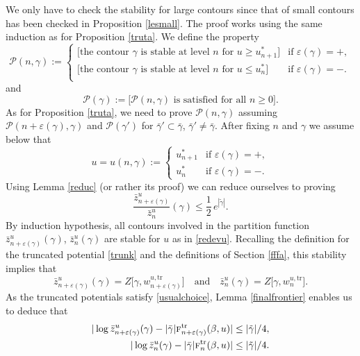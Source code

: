 \documentclass[10pt]{amsart}
\let\mathcal\mathscr
\numberwithin{equation}{section}
\theoremstyle{plain}
\theoremstyle{definition}
\newcommand{\cP}{{\ensuremath{\mathcal P}} }
\newcommand{\gb}{\beta}
\newcommand{\gep}{\varepsilon}
\newcommand{\tr}{\mathrm{tr}}
\newcommand{\tf}{\textsc{f}}
\begin{document}
We only have to check the stability for large contours since that of small contours has been checked in Proposition \ref{lesmall}.
The proof works using the same induction as for Proposition \ref{truta}.
We define the property
\begin{equation*}
\cP(n,\gamma):=\begin{cases}
\big[ \text{the contour } \gamma \text{ is stable at level } n \text{ for } u\ge u^*_{n+1} \big] &\text{if } \gep(\gamma)=+,\\
\big[ \text{the contour } \gamma \text{ is stable at level } n \text{ for } u\le u^*_{n} \big] &\text{if } \gep(\gamma)=-.\\
\end{cases}
\end{equation*}
and
\begin{equation*}
\cP(\gamma):=\big[\cP(n,\gamma) \text{ is satisfied for all } n\ge 0 \big].
\end{equation*}
As for Proposition \ref{truta},
we need to prove $\cP(n,\gamma)$ assuming $\cP(n+\gep(\gamma),\gamma)$ and $\cP(\gamma')$ for $\bar \gamma'\subset \bar\gamma$, $\bar \gamma'\ne \bar \gamma$.
After fixing $n$ and $\gamma$ we assume below that
\begin{equation}\label{redevu}
u=u(n,\gamma):= \begin{cases} u^*_{n+1} &\text{if } \gep(\gamma)=+,\\
u^*_{n} &\text{if } \gep(\gamma)=-.
\end{cases}
\end{equation}
Using Lemma \ref{reduc} (or rather its proof) we can reduce ourselves to proving
\begin{equation*}
\frac{\bar z^u_{n+\gep(\gamma)}}{\bar z^u_n}(\gamma)\le \frac{1}{2}\,e^{|\tilde\gamma|}.
\end{equation*}
By induction hypothesis, all contours involved in the partition function $\bar z^u_{n+\gep(\gamma)}(\gamma)$, $\bar z^u_n(\gamma)$
are stable for $u$ as in \eqref{redevu}.
Recalling the definition for the truncated potential \eqref{trunk} and the definitions of Section \ref{fffa},
this stability implies that
\begin{equation*}
\bar z^u_{n+\gep(\gamma)}(\gamma)=Z\bigl[\gamma, w^{u,\tr}_{n+\gep(\gamma)}\bigr] \quad\text{and}\quad \bar z^u_{n}(\gamma)=Z\bigl[\gamma, w^{u,\tr}_{n}\bigr].
\end{equation*}
As the truncated potentials satisfy \eqref{usualchoice}, Lemma \ref{finalfrontier} enables us to deduce that
\begin{equation*}
\begin{split}
|\log \bar z^u_{n+\gep(\gamma)}(\gamma)- |\bar \gamma| \tf^{\tr}_{n+\gep(\gamma)}(\gb,u) |&\le |\tilde \gamma|/4,\\
|\log \bar z^u_{n}(\gamma)- |\bar \gamma| \tf^{\tr}_{n}(\gb,u) |&\le |\tilde \gamma|/4.
\end{split}
\end{equation*}
\end{document}
